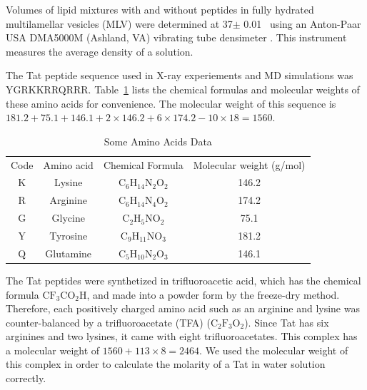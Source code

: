 Volumes of lipid mixtures with and without peptides in fully hydrated multilamellar
vesicles (MLV) were determined at 37$\pm$ 0.01 \textcelsius\ using 
an Anton-Paar USA DMA5000M (Ashland, VA) vibrating tube densimeter 
\cite{ref:}. This instrument measures the average density of a solution. 

The Tat peptide sequence used in X-ray experiements and MD simulations was 
YGRKKRRQRRR. 
Table~\ref{tb:aa} lists the chemical formulas and molecular weights of
these amino acids for convenience. The molecular 
weight of this sequence is 
$181.2+75.1+146.1+2 \times 146.2+6\times 174.2-10\times 18=1560$.
\begin{table}[ht]
  \centering
  \begin{tabular}{c c c c}
    Code & Amino acid & Chemical Formula & Molecular weight (g/mol) \\
    K & Lysine & $\mathrm{C_6H_{14}N_2O_2}$ & 146.2 \\
    R & Arginine & $\mathrm{C_6H_{14}N_4O_2}$ & 174.2 \\
    G & Glycine & $\mathrm{C_2H_5NO_2}$ & 75.1\\
    Y & Tyrosine & $\mathrm{C_9H_{11}NO_3}$ & 181.2 \\
    Q & Glutamine & $\mathrm{C_5H_{10}N_2O_3}$ & 146.1  
  \end{tabular}
  \caption{Some Amino Acids Data}
  \label{tb:aa}
\end{table}
The Tat peptides were synthetized in trifluoroacetic acid, which has 
the chemical formula $\mathrm{CF_3CO_2H}$, and made into a powder form by the 
freeze-dry method. Therefore, each positively charged amino acid such as 
an arginine and lysine was counter-balanced by a trifluoroacetate (TFA)
($\mathrm{C_2F_3O_2}$). Since Tat has six arginines and two lysines, it came 
with eight trifluoroacetates. This complex has a molecular weight of 
$1560+113\times 8=2464$. We used the 
molecular weight of this complex in order to calculate the molarity of a Tat
in water solution correctly.

